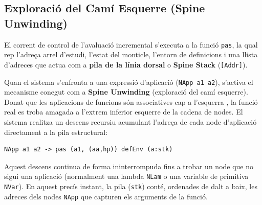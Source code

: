 \subsection{Exploració del Camí Esquerre (Spine Unwinding)}

El corrent de control de l'avaluació incremental s'executa a la funció \texttt{pas}, la qual rep l'adreça arrel d'estudi, l'estat del monticle, l'entorn de definicions i una llista d'adreces que actua com a \textbf{pila de la línia dorsal} o \textbf{Spine Stack} (\texttt{[Addr]}).

Quan el sistema s'enfronta a una expressió d'aplicació (\texttt{NApp a1 a2}), s'activa el mecanisme conegut com a \textbf{Spine Unwinding} (exploració del camí esquerre). Donat que les aplicacions de funcions són associatives cap a l'esquerra \cite{peyton1987implementation}, la funció real es troba amagada a l'extrem inferior esquerre de la cadena de nodes. El sistema realitza un descens recursiu acumulant l'adreça de cada node d'aplicació directament a la pila estructural:

\begin{lstlisting}[style=haskellstyle, caption=Cas de l'Spine Unwinding a la funció pas]
NApp a1 a2 -> pas (a1, (aa,hp)) defEnv (a:stk)
\end{lstlisting}

Aquest descens continua de forma ininterrompuda fins a trobar un node que no sigui una aplicació (normalment una lambda \texttt{NLam} o una variable de primitiva \texttt{NVar}). En aquest precís instant, la pila (\texttt{stk}) conté, ordenades de dalt a baix, les adreces dels nodes \texttt{NApp} que capturen els arguments de la funció.

